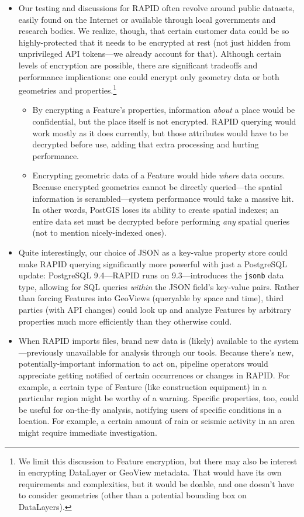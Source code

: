 \begin{itemize}
    \item Our testing and discussions for RAPID often revolve around public datasets, easily found on the Internet or available through local governments and research bodies. We realize, though, that certain customer data could be so highly-protected that it needs to be encrypted at rest (not just hidden from unprivileged API tokens---we already account for that). Although certain levels of encryption are possible, there are significant tradeoffs and performance implications: one could encrypt only geometry data or both geometries and properties.\footnote{We limit this discussion to Feature encryption, but there may also be interest in encrypting DataLayer or GeoView metadata. That would have its own requirements and complexities, but it would be doable, and one doesn't have to consider geometries (other than a potential bounding box on DataLayers).}
    \begin{itemize}
        \item By encrypting a Feature's properties, information \textit{about} a place would be confidential, but the place itself is not encrypted. RAPID querying would work mostly as it does currently, but those attributes would have to be decrypted before use, adding that extra processing and hurting performance.
        \item Encrypting geometric data of a Feature would hide \textit{where} data occurs. Because encrypted geometries cannot be directly queried---the spatial information is scrambled---system performance would take a massive hit. In other words, PostGIS loses its ability to create spatial indexes; an entire data set must be decrypted before performing \textit{any} spatial queries (not to mention nicely-indexed ones).
    \end{itemize}
    
    \item Quite interestingly, our choice of JSON as a key-value property store could make RAPID querying significantly more powerful with just a PostgreSQL update: PostgreSQL 9.4---RAPID runs on 9.3---introduces the \texttt{jsonb} data type, allowing for SQL queries \textit{within} the JSON field's key-value pairs. Rather than forcing Features into GeoViews (queryable by space and time), third parties (with API changes) could look up and analyze Features by arbitrary properties much more efficiently than they otherwise could.
    
    \item When RAPID imports files, brand new data is (likely) available to the system---previously unavailable for analysis through our tools. Because there's new, potentially-important information to act on, pipeline operators would appreciate getting notified of certain occurrences or changes in RAPID. For example, a certain type of Feature (like construction equipment) in a particular region might be worthy of a warning. Specific properties, too, could be useful for on-the-fly analysis, notifying users of specific conditions in a location. For example, a certain amount of rain or seismic activity in an area might require immediate investigation.
    

\end{itemize}
